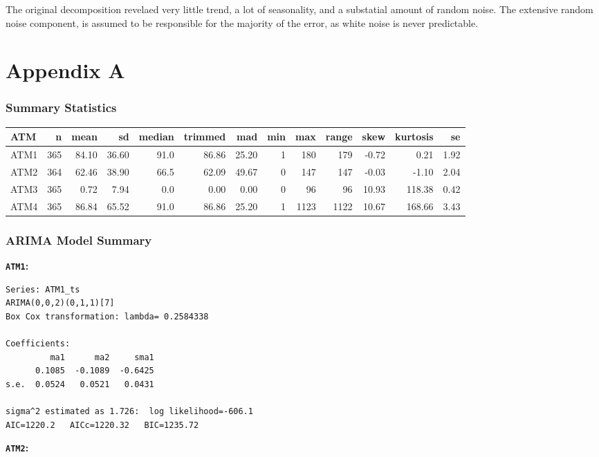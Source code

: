 \documentclass[openany]{book}
\begin{document}
The original decomposition revelaed very little trend, a lot of
seasonality, and a substatial amount of random noise. The extensive
random noise component, is assumed to be responsible for the majority of
the error, as white noise is never predictable.

\hypertarget{appendix-a}{%
\chapter*{Appendix A}\label{appendix-a}}

\hypertarget{summary-a}{%
\subsection*{Summary Statistics}\label{summary-a}}

\begin{longtable}[]{@{}lrrrrrrrrrrrr@{}}
\toprule
ATM & n & mean & sd & median & trimmed & mad & min & max & range & skew
& kurtosis & se\tabularnewline
\midrule
\endhead
ATM1 & 365 & 84.10 & 36.60 & 91.0 & 86.86 & 25.20 & 1 & 180 & 179 &
-0.72 & 0.21 & 1.92\tabularnewline
ATM2 & 364 & 62.46 & 38.90 & 66.5 & 62.09 & 49.67 & 0 & 147 & 147 &
-0.03 & -1.10 & 2.04\tabularnewline
ATM3 & 365 & 0.72 & 7.94 & 0.0 & 0.00 & 0.00 & 0 & 96 & 96 & 10.93 &
118.38 & 0.42\tabularnewline
ATM4 & 365 & 86.84 & 65.52 & 91.0 & 86.86 & 25.20 & 1 & 1123 & 1122 &
10.67 & 168.66 & 3.43\tabularnewline
\bottomrule
\end{longtable}

\hypertarget{arima-a}{%
\subsection*{ARIMA Model Summary}\label{arima-a}}

\textbf{\texttt{ATM1}:}

\begin{verbatim}
Series: ATM1_ts 
ARIMA(0,0,2)(0,1,1)[7] 
Box Cox transformation: lambda= 0.2584338 

Coefficients:
         ma1      ma2     sma1
      0.1085  -0.1089  -0.6425
s.e.  0.0524   0.0521   0.0431

sigma^2 estimated as 1.726:  log likelihood=-606.1
AIC=1220.2   AICc=1220.32   BIC=1235.72
\end{verbatim}

\textbf{\texttt{ATM2}:}
\end{document}
